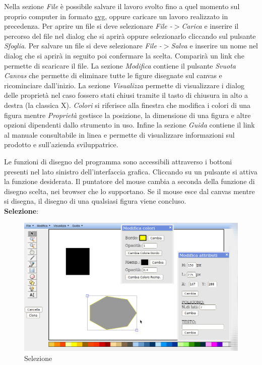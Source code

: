  
Nella sezione \textit{File} \`e possibile salvare il lavoro svolto fino a quel momento sul proprio computer in formato \underline{svg}, oppure caricare un lavoro realizzato in precedenza.
Per aprire un file si deve selezionare \textit{File -$ > $Carica} e inserire il percorso del file nel dialog che si aprir\`a oppure selezionarlo cliccando sul pulsante \textit{Sfoglia}.
Per salvare un file si deve selezionare \textit{File -$ > $Salva} e inserire un nome nel dialog che si aprir\`a in seguito poi confermare la scelta. Comparir\`a un link che permette di scaricare il file.
La sezione \textit{Modifica} contiene il pulsante \textit{Svuota Canvas} che permette di eliminare tutte le figure disegnate sul canvas e ricominciare dall'inizio.
La sezione \textit{Visualizza} permette di visualizzare i dialog delle propriet\`a nel caso fossero stati chiusi tramite il tasto di chiusura in alto a destra (la classica X). \textit{Colori} si riferisce alla finestra che modifica i colori di una figura mentre \textit{Propriet\`a} gestisce la posizione, la dimensione di una figura e altre opzioni dipendenti dallo strumento in uso.
Infine la sezione \textit{Guida} contiene il link al manuale consultabile in linea e permette di visualizzare informazioni sul prodotto e sull'azienda sviluppatrice.
\newpage
 
Le funzioni di disegno del programma sono accessibili attraverso i bottoni presenti nel lato sinistro dell'interfaccia grafica. Cliccando su un pulsante si attiva la funzione desiderata. Il puntatore del mouse cambia a seconda della funzione di disegno scelta, nei browser che lo supportano. Se il mouse esce dal canvas mentre si disegna, il disegno di una qualsiasi figura viene concluso. \\
 
\textbf{Selezione}:\\
\begin{figure}[!ht]
\centering
\includegraphics[scale=0.5]{images/selezione.png}
\caption{Selezione}
\end{figure}
 

